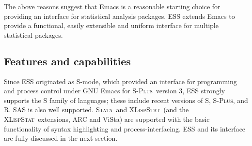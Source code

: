 \documentclass{article}
\newcommand*{\SAS}{\textsc{SAS}{\textregistered} }
\newcommand*{\Splus}{\textsc{S-Plus}}
\newcommand*{\XLispStat}{\textsc{XLispStat}}
\newcommand*{\Stata}{\textsc{Stata}}
\newcommand{\stexttt}[1]{{\small\texttt{#1}}}
\begin{document}
The above reasons suggest that Emacs is a reasonable starting choice
for providing an interface for statistical analysis packages.  ESS
extends Emacs to provide a functional, easily extensible and uniform
interface for multiple statistical packages.






\subsection{Features and capabilities}
\label{sec:ESS:features}

Since ESS originated as S-mode, which provided an interface for
programming and process control under GNU Emacs for \Splus\ version 3,
ESS strongly supports the S family of languages; these include recent
versions of S, \Splus, and R.  \SAS is also well supported.  \Stata\ 
and \XLispStat\ (and the \XLispStat\ extensions, ARC and ViSta) are
supported with the basic functionality of syntax highlighting and
process-interfacing.  ESS and its interface are fully discussed in the
next section.
\end{document}
